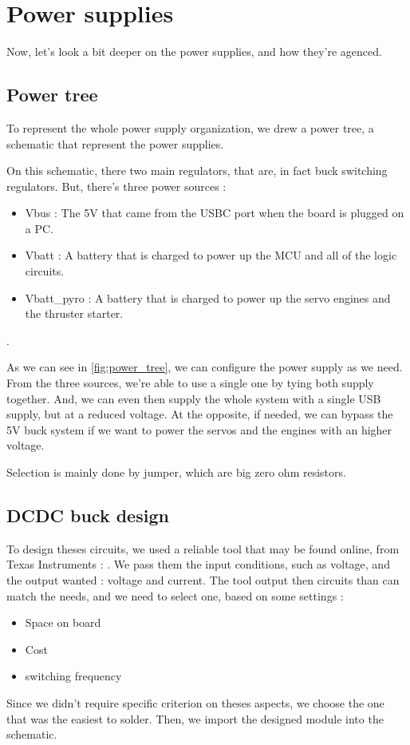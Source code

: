 \section{Power supplies}
Now, let's look a bit deeper on the power supplies, and how they're agenced.
\subsection{Power tree}
To represent the whole power supply organization, we drew a power tree, a schematic that
represent the power supplies.



On this schematic, there two main regulators, that are, in fact buck switching regulators.
But, there's three power sources :
\begin{itemize}[noitemsep]
    \item   Vbus : The 5V that came from the USBC port when the board is plugged on a PC.
    \item   Vbatt : A battery that is charged to power up the MCU and all of the logic
          circuits.
    \item   Vbatt\_pyro : A battery that is charged to power up the servo engines and
          the thruster starter.
\end{itemize}.

As we can see in \ref{fig:power_tree}, we can configure the power supply as we need.
From the three sources, we're able to use a single one by tying both supply together.
And, we can even then supply the whole system with a single USB supply, but at a reduced
voltage. At the opposite, if needed, we can bypass the 5V buck system if we want to
power the servos and the engines with an higher voltage.

Selection is mainly done by jumper, which are big zero ohm resistors.

\subsection{DCDC buck design}
To design theses circuits, we used a reliable tool that may be found online, from
Texas Instruments : \cite{POWERDESIGNER}. We pass them the input conditions, such as
voltage, and the output wanted : voltage and current. The tool output then circuits
than can match the needs, and we need to select one, based on some settings :

\begin{itemize}[noitemsep]
    \item   Space on board
    \item   Cost
    \item   switching frequency
\end{itemize}

Since we didn't require specific criterion on theses aspects, we choose the one that
was the easiest to solder. Then, we import the designed module into the schematic.

